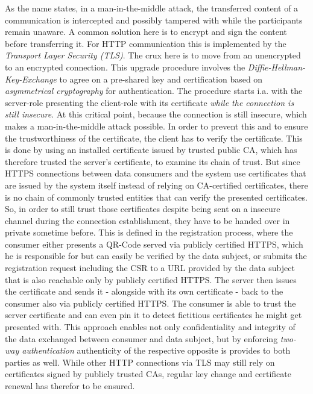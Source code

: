 \documentclass[12pt,english,a4paper,titlepage,cleardoublepage=empty,dottedtoc]{report}
\begin{document}
As the name states, in a man-in-the-middle attack, the transferred
content of a communication is intercepted and possibly tampered with
while the participants remain unaware. A common solution here is to
encrypt and sign the content before transferring it. For HTTP
communication this is implemented by the \emph{Transport Layer Security
(TLS)}. The crux here is to move from an unencrypted to an encrypted
connection. This upgrade procedure involves the
\emph{Diffie-Hellman-Key-Exchange} to agree on a pre-shared key and
certification based on \emph{asymmetrical cryptography} for
authentication. The procedure starts i.a. with the server-role
presenting the client-role with its certificate \emph{while the
connection is still insecure}. At this critical point, because the
connection is still insecure, which makes a man-in-the-middle attack
possible. In order to prevent this and to ensure the trustworthiness of
the certificate, the client has to verify the certificate. This is done
by using an installed certificate issued by trusted public CA, which has
therefore trusted the server's certificate, to examine its chain of
trust. But since HTTPS connections between data consumers and the system
use certificates that are issued by the system itself instead of relying
on CA-certified certificates, there is no chain of commonly trusted
entities that can verify the presented certificates. So, in order to
still trust those certificates despite being sent on a insecure channel
during the connection establishment, they have to be handed over in
private sometime before. This is defined in the registration process,
where the consumer either presents a QR-Code served via publicly
certified HTTPS, which he is responsible for but can easily be verified
by the data subject, or submits the registration request including the
CSR to a URL provided by the data subject that is also reachable only by
publicly certified HTTPS. The server then issues the certificate and
sends it - alongside with its own certificate - back to the consumer
also via publicly certified HTTPS. The consumer is able to trust the
server certificate and can even pin it to detect fictitious certificates
he might get presented with. This approach enables not only
confidentiality and integrity of the data exchanged between consumer and
data subject, but by enforcing \emph{two-way authentication}
authenticity of the respective opposite is provides to both parties as
well. While other HTTP connections via TLS may still rely on
certificates signed by publicly trusted CAs, regular key change and
certificate renewal has therefor to be ensured.
\end{document}
